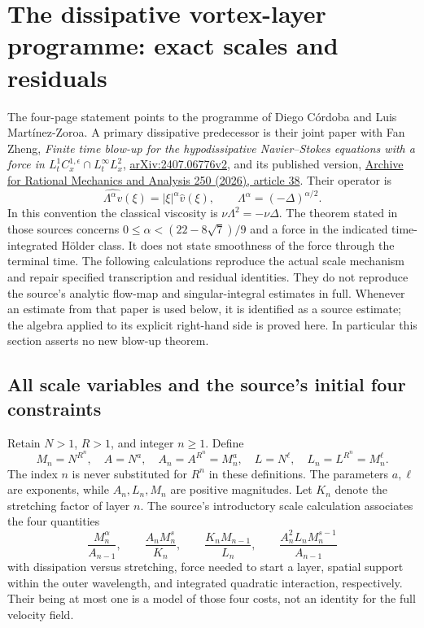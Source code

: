 \section{The dissipative vortex-layer programme: exact scales and residuals}
\label{sec:forced-program-scales}

The four-page statement points to the programme of Diego C\'ordoba and Luis
Mart\'inez-Zoroa.  A primary dissipative predecessor is their joint paper with
Fan Zheng, \emph{Finite time blow-up for the hypodissipative Navier--Stokes
equations with a force in $L^1_tC_x^{1,\epsilon}\cap L^\infty_tL_x^2$},
\href{https://arxiv.org/abs/2407.06776v2}{arXiv:2407.06776v2}, and its published
version, \href{https://doi.org/10.1007/s00205-026-02198-0}{Archive for Rational
Mechanics and Analysis 250 (2026), article 38}.
Their operator is
\[
 \widehat{\Lambda^\alpha v}(\xi)=|\xi|^\alpha\widehat v(\xi),\qquad
 \Lambda^\alpha=(-\Delta)^{\alpha/2}.
\]
In this convention the classical viscosity is $\nu\Lambda^2=-\nu\Delta$.
The theorem stated in those sources concerns
$0\leq\alpha<(22-8\sqrt7)/9$ and a force in the indicated time-integrated
H\"older class. It does not state smoothness of the force through the terminal
time. The following calculations reproduce the actual scale mechanism and
repair specified transcription and residual identities. They do not reproduce
the source's analytic flow-map and singular-integral estimates in full.
Whenever an estimate from that paper is used below, it is identified as a
source estimate; the algebra applied to its explicit right-hand side is proved
here. In particular this section asserts no new blow-up theorem.

\subsection{All scale variables and the source's initial four constraints}

Retain $N>1$, $R>1$, and integer $n\geq1$. Define
\[
 M_n=N^{R^n},\quad A=N^a,\quad A_n=A^{R^n}=M_n^a,
 \quad L=N^\ell,\quad L_n=L^{R^n}=M_n^\ell.
\]
The index $n$ is never substituted for $R^n$ in these definitions. The
parameters $a,\ell$ are exponents, while $A_n,L_n,M_n$ are positive magnitudes.
Let $K_n$ denote the stretching factor of layer $n$.
The source's introductory scale calculation associates the four quantities
\[
 \frac{M_n^\alpha}{A_{n-1}},\qquad
 \frac{A_nM_n^s}{K_n},\qquad
 \frac{K_nM_{n-1}}{L_n},\qquad
 \frac{A_n^2L_nM_n^{s-1}}{A_{n-1}}
 \tag{FS1}\label{eq:fs-four}
\]
with dissipation versus stretching, force needed to start a layer, spatial
support within the outer wavelength, and integrated quadratic interaction,
respectively. Their being at most one is a model of those four costs, not an
identity for the full velocity field.

